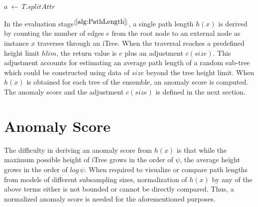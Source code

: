 \vspace{1em}
\begin{algorithm}[H]
    \caption{$PathLength(x, T, hlim, e)$}\label{alg:PathLength}
    \DontPrintSemicolon
    \SetAlgoLined


    $a \: \leftarrow \: T.splitAttr$

\end{algorithm}
\pagebreak

In the evaluation stage$^{[\ref{alg:PathLength}]}$, a single path length $h(x)$ is derived by counting the number of edges $e$ from the root node to an external node as instance $x$ traverses through an iTree.
When the traversal reaches a predefined height limit $hlim$, the return value is $e$ plus an adjustment $c(size)$.
This adjustment accounts for estimating an average path length of a random sub-tree which could be constructed using data of $size$ beyond the tree height limit.
When $h(x)$ is obtained for each tree of the ensemble, an anomaly score is computed.
The anomaly score and the adjustment $c(size)$ is defined in the next section.

\section{Anomaly Score}
\label{sec:iforest-anomaly-score}

The difficulty in deriving an anomaly score from $h(x)$ is that while the maximum possible height of iTree grows in the order of $\psi$, the average height grows in the order of $log\,\psi$.
When required to visualize or compare path lengths from models of different subsampling sizes, normalization of $h(x)$ by any of the above terms either is not bounded or cannot be directly compared.
Thus, a normalized anomaly score is needed for the aforementioned purposes.

